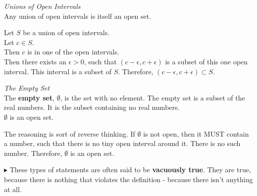 \documentclass{ximera}
\begin{document}
\begin{example}  \textit{Unions of Open Intervals} \\


Any union of open intervals is itself an open set.



\begin{explanation}

Let $S$ be a union of open intervals.  \\
Let $c \in S$. \\
Then $c$ is in one of the open intervals. \\
Then there exists an $\epsilon > 0$, such that $(c - \epsilon, c + \epsilon)$ is a subset of this one open interval.  This interval is a subset of $S$.  Therefore, $(c - \epsilon, c + \epsilon) \subset S$. \\


\end{explanation}

\end{example}















\begin{example}  \textit{The Empty Set} \\


The \textbf{empty set}, $\emptyset$, is the set with no element.  The empty set is a subset of the real numbers.  It is the subset containing no real numbers. \\


$\emptyset$ is an open set. \\



\begin{explanation}


The reasoning is sort of reverse thinking.  If $\emptyset$ is not open, then it MUST contain a number, such that there is no tiny open interval around it.  There is no such number.  Therefore, $\emptyset$ is an open set.


\end{explanation}

\end{example}

$\blacktriangleright$ These types of statements are often said to be \textbf{vacuously true}.  They are true, because there is nothing that violates the definition - because there isn't anything at all. 
\end{document}
